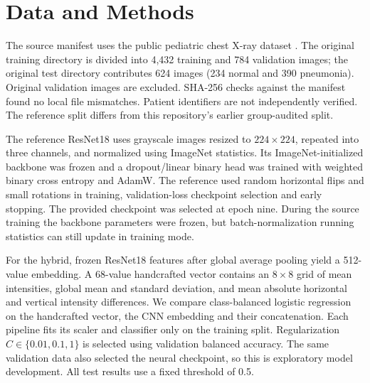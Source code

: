 \documentclass[conference]{IEEEtran}
\begin{document}
\section{Data and Methods}
The source manifest uses the public pediatric chest X-ray dataset \cite{kaggle}. The original training directory is divided into 4,432 training and 784 validation images; the original test directory contributes 624 images (234 normal and 390 pneumonia). Original validation images are excluded. SHA-256 checks against the manifest found no local file mismatches. Patient identifiers are not independently verified. The reference split differs from this repository's earlier group-audited split.

The reference ResNet18 uses grayscale images resized to $224\times224$, repeated into three channels, and normalized using ImageNet statistics. Its ImageNet-initialized backbone was frozen and a dropout/linear binary head was trained with weighted binary cross entropy and AdamW. The reference used random horizontal flips and small rotations in training, validation-loss checkpoint selection and early stopping. The provided checkpoint was selected at epoch nine. During the source training the backbone parameters were frozen, but batch-normalization running statistics can still update in training mode.

For the hybrid, frozen ResNet18 features after global average pooling yield a 512-value embedding. A 68-value handcrafted vector contains an $8\times8$ grid of mean intensities, global mean and standard deviation, and mean absolute horizontal and vertical intensity differences. We compare class-balanced logistic regression on the handcrafted vector, the CNN embedding and their concatenation. Each pipeline fits its scaler and classifier only on the training split. Regularization $C\in\{0.01,0.1,1\}$ is selected using validation balanced accuracy. The same validation data also selected the neural checkpoint, so this is exploratory model development. All test results use a fixed threshold of 0.5.
\end{document}
